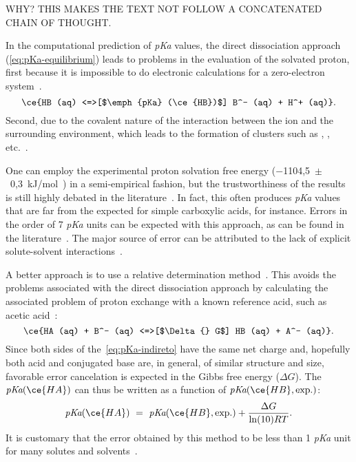 WHY?\@
THIS MAKES THE TEXT NOT FOLLOW A CONCATENATED CHAIN OF THOUGHT.\@

In the computational prediction of \emph{pKa} values,
the direct dissociation approach (\cref{eq:pKa-equilibrium})
leads to problems in the evaluation of the solvated proton,
first because it is impossible to do electronic calculations for a zero-electron
system~\cite{Ding_2009,Sumon_2012}.
%
\begin{equation}
	\ce{HB (aq) <=>[$\emph{pKa} (\ce{HB})$] B^- (aq) + H^+ (aq)}\text{.}
	\label{eq:pKa-equilibrium}
\end{equation}
%
Second, due to the covalent nature of the interaction between the  ion
and the surrounding environment, which leads to the formation of clusters such
as , , etc.~\cite{Sumon_2012}.

One can employ the experimental proton solvation free energy
($-$1104,5~$\pm$~0,3~kJ/mol~\cite{Tissandier_1998,Marenich_2009}) in a
semi-empirical fashion, but the trustworthiness of the results is still highly
debated in the literature~\cite{Yang_2013}.
In fact, this often produces \emph{pKa} values that are far from the expected
for simple carboxylic acids, for instance.
Errors in the order of 7 \emph{pKa} units can be expected with this approach,
as can be found in the literature~\cite{Pliego_2002,Ding_2009}.
The major source of error can be attributed to the lack of explicit
solute-solvent interactions~\cite{Pliego_2002}.

A better approach is to use a relative determination method~\cite{Ding_2009}.
This avoids the problems associated with the direct dissociation approach
by calculating the associated problem of proton exchange with a known reference
acid, such as acetic acid~\cite{Goldberg_2002}:
%
\begin{equation}
	\ce{HA (aq) + B^- (aq) <=>[$\Delta{} G$] HB (aq) + A^- (aq)}\text{.}
	\label{eq:pKa-indireto}
\end{equation}
%
Since both sides of the~\cref{eq:pKa-indireto}
have the same net charge and, hopefully both acid and conjugated base are, in
general, of similar structure and size, favorable error cancelation is expected
in the Gibbs free energy ($\Delta G$).
The $\emph{pKa}(\ce{HA})$
can thus be written as a function of $\emph{pKa}(\ce{HB}, \text{exp.})$:
%
\begin{equation}
	\emph{pKa}(\ce{HA})~=~\emph{pKa}(\ce{HB}, \text{exp.}) + \frac{\Delta G}{\ln(10) R T}\text{.}
\end{equation}
%
It is customary that the error obtained by this method to be less than 1 \emph{pKa}
unit for many solutes and solvents~\cite{Ding_2009}.
